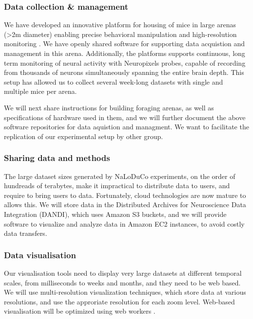 \subsubsection{Data collection \& management}

We have developed an innovative platform for housing of mice in large arenas
(\textgreater 2m diameter) enabling precise behavioral manipulation and
high-resolution monitoring \citep[Figure~\ref{fig:arena}, ][]{campagnerEtAl24}.
%
We have openly shared software for supporting data acquistion
\citep{aeonacquisition} and management \citep{aeonmecha} in this
arena.
%
Additionally, the platforms supports continuous, long term monitoring of neural
activity with Neuropixels probes, capable of recording from thousands of
neurons simultaneously spanning the entire brain depth.
%
This setup has allowed us to collect several week-long datasets with single and
multiple mice per arena.

We will next share instructions for building foraging arenas, as well as
specifications of hardware used in them,
%
and we will further document the above software repositories for data aquistion
and managment.
%
We want to facilitate the replication of our experimental setup by other group.



\subsubsection{Sharing data and methods}

The large dataset sizes generated by NaLoDuCo experiments, on the order of
hundreads of terabytes,  make it impractical to distribute data to users, and
require to bring users to data. Fortunately, cloud technologies are now mature
to allows this.
%
We will store data in the Distributed Archives for Neuroscience Data
Integration (DANDI), which uses Amazon S3 buckets, and we will provide software
to visualize and analyze data in Amazon EC2 instances, to avoid costly data
transfers.

\subsubsection{Data visualisation}

Our visualisation tools
need to display very large datasets at different temporal scales, from
milliseconds to weeks and months, and they need to be web based.
%
We will use multi-resolution visualization techniques, which store data at
various resolutions, and use the approriate resolution for each zoom level.
%
Web-based visualisation will be optimized using web workers
\citep{webWorkers}.

